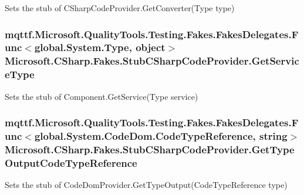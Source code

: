 Sets the stub of C\-Sharp\-Code\-Provider.\-Get\-Converter(\-Type type)

\hypertarget{class_microsoft_1_1_c_sharp_1_1_fakes_1_1_stub_c_sharp_code_provider_a9cf970739d51429418052c16cef08afb}{
\subsubsection[{Get\-Service\-Type}]{\setlength{\rightskip}{0pt plus 5cm}mqttf.\-Microsoft.\-Quality\-Tools.\-Testing.\-Fakes.\-Fakes\-Delegates.\-Func$<$global.\-System.\-Type, object$>$ Microsoft.\-C\-Sharp.\-Fakes.\-Stub\-C\-Sharp\-Code\-Provider.\-Get\-Service\-Type}}\label{class_microsoft_1_1_c_sharp_1_1_fakes_1_1_stub_c_sharp_code_provider_a9cf970739d51429418052c16cef08afb}


Sets the stub of Component.\-Get\-Service(\-Type service)

\hypertarget{class_microsoft_1_1_c_sharp_1_1_fakes_1_1_stub_c_sharp_code_provider_a394bd0229660a6961ae8d90f86c7e990}{
\subsubsection[{Get\-Type\-Output\-Code\-Type\-Reference}]{\setlength{\rightskip}{0pt plus 5cm}mqttf.\-Microsoft.\-Quality\-Tools.\-Testing.\-Fakes.\-Fakes\-Delegates.\-Func$<$global.\-System.\-Code\-Dom.\-Code\-Type\-Reference, string$>$ Microsoft.\-C\-Sharp.\-Fakes.\-Stub\-C\-Sharp\-Code\-Provider.\-Get\-Type\-Output\-Code\-Type\-Reference}}\label{class_microsoft_1_1_c_sharp_1_1_fakes_1_1_stub_c_sharp_code_provider_a394bd0229660a6961ae8d90f86c7e990}


Sets the stub of Code\-Dom\-Provider.\-Get\-Type\-Output(\-Code\-Type\-Reference type)

